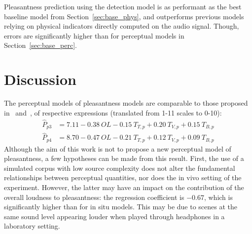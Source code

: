\documentclass[11pt,a4paper]{article}
\begin{document}
Pleasantness prediction using the detection model is as performant as the best baseline model from Section~\ref{sec:base_phys}, and outperforms previous models relying on physical indicators directly computed on the audio signal. Though, errors are significantly higher than for perceptual models in Section~\ref{sec:base_perc}.\\

\section{Discussion}
\label{sec:discussion}

The perceptual models of pleasantness models are comparable to those proposed in~\cite{ricciardi2014} and~\cite{aumond2017}, of respective expressions (translated from 1-11 scales to 0-10):
\begin{align}
\hat P_{p3} &= 7.11 - 0.38~OL - 0.15~T_{T, p} + 0.20~T_{V, p} + 0.15~T_{B, p}\\
\hat P_{p4} &= 8.70 - 0.47~OL - 0.21~T_{T, p} + 0.12~T_{V, p} + 0.09~T_{B, p}
\end{align}
Although the aim of this work is not to propose a new perceptual model of pleasantness, a few hypotheses can be made from this result. First, the use of a simulated corpus with low source complexity does not alter the fundamental relationships between perceptual quantities, nor does the in vivo setting of the experiment. However, the latter may have an impact on the contribution of the overall loudness to pleasantness: the regression coefficient is $-0.67$, which is significantly higher than for in situ models. This may be due to scenes at the same sound level appearing louder when played through headphones in a laboratory setting.\\
		
\end{document}

